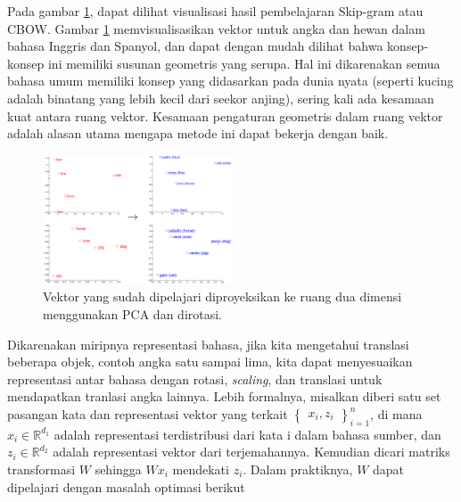 \documentclass[conference]{IEEEtran}
\begin{document}
	Pada gambar \ref{fig:ilustrasi_embedding_inggris_spanyol}, dapat dilihat visualisasi hasil pembelajaran Skip-gram atau CBOW. Gambar \ref{fig:ilustrasi_embedding_inggris_spanyol} memvisualisasikan vektor untuk angka dan hewan dalam bahasa Inggris dan Spanyol, dan dapat dengan mudah dilihat bahwa konsep-konsep ini memiliki susunan geometris yang serupa. Hal ini dikarenakan semua bahasa umum memiliki konsep yang didasarkan pada dunia nyata (seperti kucing adalah binatang yang lebih kecil dari seekor anjing), sering kali ada kesamaan kuat antara ruang vektor. Kesamaan pengaturan geometris dalam ruang vektor adalah alasan utama mengapa metode ini dapat bekerja dengan baik.

	\begin{figure}[htbp]
	    \centerline{
	    \includegraphics[width=0.5\textwidth]{resources/ilustration-eng-spn-word.png}}
	    \caption[Ilustrasi ruang \textit{embedding} antara bahasa Inggris dan Spanyol \cite{b12}.]{ Vektor yang sudah dipelajari diproyeksikan ke ruang dua dimensi menggunakan PCA dan dirotasi.}
	    \label{fig:ilustrasi_embedding_inggris_spanyol}
	\end{figure}

	Dikarenakan miripnya representasi bahasa, jika kita mengetahui translasi beberapa objek, contoh angka satu sampai lima, kita dapat menyesuaikan representasi antar bahasa dengan rotasi, \textit{scaling}, dan translasi untuk mendapatkan tranlasi angka lainnya. Lebih formalnya, misalkan diberi satu set pasangan kata dan representasi vektor yang terkait \begin{math} \begin{Bmatrix} {x_{i}, z_{i}} \end{Bmatrix}_{i=1}^{n} \end{math}, di mana \(x_{i}\in\mathbb{R}^{d_{1}}\) adalah representasi terdistribusi dari kata i dalam bahasa sumber, dan \(z_{i}\in\mathbb{R}^{d_{2}}\) adalah representasi vektor dari terjemahannya. Kemudian dicari matriks transformasi \( W\) sehingga \(W x_{i}\) mendekati \(z_{i}\). Dalam praktiknya, \(W\) dapat dipelajari dengan masalah optimasi berikut
\end{document}
